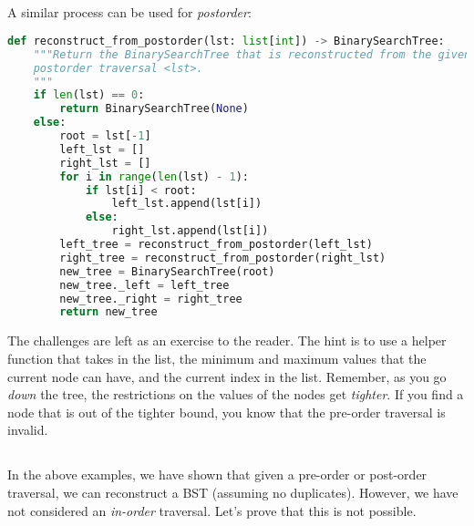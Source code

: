\documentclass[12pt]{article}
\begin{document}
  \subsection{}
  A similar process can be used for \textit{postorder}:

  \begin{lstlisting}[language=Python, style=mystyle]
def reconstruct_from_postorder(lst: list[int]) -> BinarySearchTree:
    """Return the BinarySearchTree that is reconstructed from the given
    postorder traversal <lst>.
    """
    if len(lst) == 0:
        return BinarySearchTree(None)
    else:
        root = lst[-1]
        left_lst = []
        right_lst = []
        for i in range(len(lst) - 1):
            if lst[i] < root:
                left_lst.append(lst[i])
            else:
                right_lst.append(lst[i])
        left_tree = reconstruct_from_postorder(left_lst)
        right_tree = reconstruct_from_postorder(right_lst)
        new_tree = BinarySearchTree(root)
        new_tree._left = left_tree
        new_tree._right = right_tree
        return new_tree
  \end{lstlisting}

  The challenges are left as an exercise to the reader. The hint is to use a helper function that takes in the list, the minimum and maximum values that the current node can have, and the current index in the list. Remember, as you go \textit{down} the tree, the restrictions on the values of the nodes get \textit{tighter}. If you find a node that is out of the tighter bound, you know that the pre-order traversal is invalid.

  \subsection{}
  In the above examples, we have shown that given a pre-order or post-order traversal, we can reconstruct a BST (assuming no duplicates). However, we have not considered an \textit{in-order} traversal. Let's prove that this is not possible.
  
\end{document}
